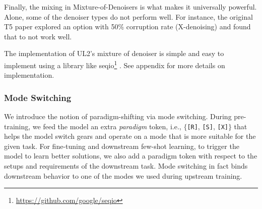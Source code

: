 \documentclass[10pt]{article}
\begin{document}
Finally, the mixing in Mixture-of-Denoisers is what makes it universally powerful. Alone,  some of the denoiser types do not perform well. For instance, the original T5 paper explored an option with 50\% corruption rate (X-denoising) and found that to not work well. 

The implementation of UL2's mixture of denoiser is simple and easy to implement using a library like seqio\footnote{\url{https://github.com/google/seqio}} \citep{https://doi.org/10.48550/arxiv.2203.17189}. See appendix for more details on implementation.



\subsubsection{Mode Switching}
We introduce the notion of paradigm-shifting via mode switching. During pre-training, we feed the model an extra \emph{paradigm} token, i.e., $\{$\texttt{[R]}, \texttt{[S]}, \texttt{[X]}$\}$ that helps the model switch gears and operate on a mode that is more suitable for the given task. For fine-tuning and downstream few-shot learning, to trigger the model to learn better solutions, we also add a paradigm token with respect to the setups and requirements of the downstream task. Mode switching in fact binds downstream behavior to one of the modes we used during upstream training. 
\end{document}
